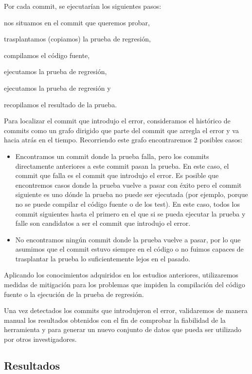 Por cada commit, se ejecutarían los siguientes pasos:
\begin{inparaenum}[\bf(1)]
    \item nos situamos en el commit que queremos probar,
    \item trasplantamos (copiamos) la prueba de regresión,
    \item compilamos el código fuente,
    \item ejecutamos la prueba de regresión,
    \item ejecutamos la prueba de regresión y
    \item recopilamos el resultado de la prueba.
\end{inparaenum}

Para localizar el commit que introdujo el error, consideramos el histórico de commits como un grafo dirigido que parte del commit que arregla el error y va hacia atrás en el tiempo. 
Recorriendo este grafo encontraremos 2 posibles casos:
\begin{itemize}
    \item Encontramos un commit donde la prueba falla, pero los commits directamente anteriores a este commit pasan la prueba. En este caso, el commit que falla es el commit que introdujo el error. Es posible que encontremos casos donde la prueba vuelve a pasar con éxito pero el commit siguiente es uno dónde la prueba no puede ser ejecutada (por ejemplo, porque no se puede compilar el código fuente o de los test). En este caso, todos los commit siguientes hasta el primero en el que si se pueda ejecutar la prueba y falle son candidatos a ser el commit que introdujo el error.
    \item No encontramos ningún commit donde la prueba vuelve a pasar, por lo que asumimos que el commit estuvo siempre en el código o no fuimos capaces de trasplantar la prueba lo suficientemente lejos en el pasado.
\end{itemize}

Aplicando los conocimientos adquiridos en los estudios anteriores, utilizaremos medidas de mitigación para los problemas que impiden la compilación del código fuente o la ejecución de la prueba de regresión.

Una vez detectados los commits que introdujeron el error, validaremos de manera manual los resultados obtenidos con el fin de comprobar la fiabilidad de la herramienta y para generar un nuevo conjunto de datos que pueda ser utilizado por otros investigadores.

\subsection{Resultados}

